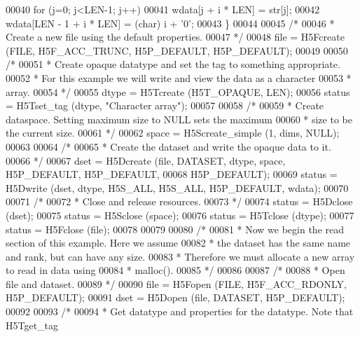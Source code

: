 \begin{DoxyCode}
00040         \textcolor{keywordflow}{for} (j=0; j<LEN-1; j++)
00041             wdata[j + i * LEN] = str[j];
00042         wdata[LEN - 1 + i * LEN] = (char) i + \textcolor{charliteral}{'0'};
00043     \}
00044 
00045     \textcolor{comment}{/*}
00046 \textcolor{comment}{     * Create a new file using the default properties.}
00047 \textcolor{comment}{     */}
00048     file = H5Fcreate (FILE, H5F\_ACC\_TRUNC, H5P\_DEFAULT, H5P\_DEFAULT);
00049 
00050     \textcolor{comment}{/*}
00051 \textcolor{comment}{     * Create opaque datatype and set the tag to something appropriate.}
00052 \textcolor{comment}{     * For this example we will write and view the data as a character}
00053 \textcolor{comment}{     * array.}
00054 \textcolor{comment}{     */}
00055     dtype = H5Tcreate (H5T\_OPAQUE, LEN);
00056     status = H5Tset\_tag (dtype, \textcolor{stringliteral}{"Character array"});
00057 
00058     \textcolor{comment}{/*}
00059 \textcolor{comment}{     * Create dataspace.  Setting maximum size to NULL sets the maximum}
00060 \textcolor{comment}{     * size to be the current size.}
00061 \textcolor{comment}{     */}
00062     space = H5Screate\_simple (1, dims, NULL);
00063 
00064     \textcolor{comment}{/*}
00065 \textcolor{comment}{     * Create the dataset and write the opaque data to it.}
00066 \textcolor{comment}{     */}
00067     dset = H5Dcreate (file, DATASET, dtype, space, H5P\_DEFAULT, H5P\_DEFAULT,
00068                 H5P\_DEFAULT);
00069     status = H5Dwrite (dset, dtype, H5S\_ALL, H5S\_ALL, H5P\_DEFAULT, wdata);
00070 
00071     \textcolor{comment}{/*}
00072 \textcolor{comment}{     * Close and release resources.}
00073 \textcolor{comment}{     */}
00074     status = H5Dclose (dset);
00075     status = H5Sclose (space);
00076     status = H5Tclose (dtype);
00077     status = H5Fclose (file);
00078 
00079 
00080     \textcolor{comment}{/*}
00081 \textcolor{comment}{     * Now we begin the read section of this example.  Here we assume}
00082 \textcolor{comment}{     * the dataset has the same name and rank, but can have any size.}
00083 \textcolor{comment}{     * Therefore we must allocate a new array to read in data using}
00084 \textcolor{comment}{     * malloc().}
00085 \textcolor{comment}{     */}
00086 
00087     \textcolor{comment}{/*}
00088 \textcolor{comment}{     * Open file and dataset.}
00089 \textcolor{comment}{     */}
00090     file = H5Fopen (FILE, H5F\_ACC\_RDONLY, H5P\_DEFAULT);
00091     dset = H5Dopen (file, DATASET, H5P\_DEFAULT);
00092 
00093     \textcolor{comment}{/*}
00094 \textcolor{comment}{     * Get datatype and properties for the datatype.  Note that H5Tget\_tag}

\end{DoxyCode}
